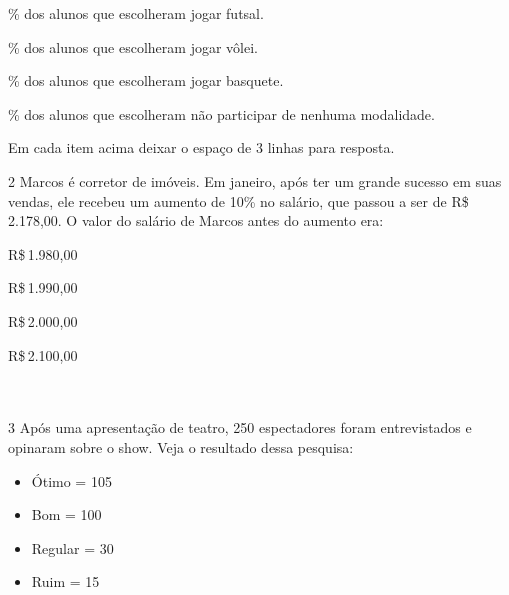 \begin{escolha}[itemsep=0pt]
\item \% dos alunos que escolheram jogar futsal.\\
\item \% dos alunos que escolheram jogar vôlei.\\
\item \% dos alunos que escolheram jogar basquete.\\
\item \% dos alunos que escolheram não participar de nenhuma modalidade.\\
\end{escolha}

Em cada item acima deixar o espaço de 3 linhas para resposta.






\num{2} Marcos é corretor de imóveis. Em janeiro, após ter um grande sucesso
em suas vendas, ele recebeu um aumento de 10\% no salário, que passou a
ser de R\$\,2.178,00. O valor do salário de Marcos antes do aumento era:

\begin{escolha}[itemsep=0pt]
\item R\$\,1.980,00
\item R\$\,1.990,00
\item R\$\,2.000,00
\item R\$\,2.100,00
\end{escolha}



\\
\\

\num{3} Após uma apresentação de teatro, 250 espectadores foram entrevistados
e opinaram sobre o show. Veja o resultado dessa pesquisa:

\begin{itemize}
\item
  Ótimo = 105
\item
  Bom = 100
\item
  Regular = 30
\item
  Ruim = 15
\end{itemize}

